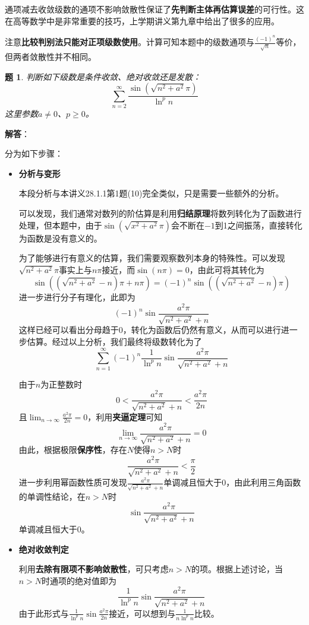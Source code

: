 \documentclass[a4paper,UTF8,fontset=windows,AutoFakeBold]{ctexart}
\newcommand*{\suminf}[1][n=1]{\sum_{#1}^\infty}
\newcommand*{\note}{\noindent *}
\theoremstyle{ex}
\newtheorem{exercise}{题}
\newcommand{\sol}[1]{{\vspace{5pt}\kaishu\noindent\textbf{解答}：\vspace{-3pt}
\begin{compactitem}
    \item[] #1
\end{compactitem}
}}
\begin{document}
\note 通项减去收敛级数的通项不影响敛散性保证了\textbf{先判断主体再估算误差}的可行性。这在高等数学中是非常重要的技巧，上学期讲义第九章中给出了很多的应用。

\note 注意\textbf{比较判别法只能对正项级数使用}。计算可知本题中的级数通项与$\frac{(-1)^n}{\sqrt{n}}$等价，但两者敛散性并不相同。

\begin{framed}
\begin{exercise}
    判断如下级数是条件收敛、绝对收敛还是发散：
    $$\suminf[n=2]\frac{\sin(\sqrt{n^2+a^2}\pi)}{\ln^pn}$$
    这里参数$a\ne0$、$p\ge0$。
\end{exercise}
\sol{
    分为如下步骤：
    \begin{itemize}
        \item \textbf{分析与变形}
        
        \note 本段分析与本讲义28.1.1第1题(10)完全类似，只是需要一些额外的分析。
                
        可以发现，我们通常对数列的阶估算是利用\textbf{归结原理}将数列转化为了函数进行处理，但本题中，由于$\sin(\sqrt{x^2+a^2}\pi)$会不断在$-1$到1之间振荡，直接转化为函数是没有意义的。

        为了能够进行有意义的估算，我们需要观察数列本身的特殊性。可以发现$\sqrt{n^2+a^2}\pi$事实上与$n\pi$接近，而$\sin(n\pi)=0$，由此可将其转化为
        $$\sin((\sqrt{n^2+a^2}-n)\pi+n\pi)=(-1)^n\sin((\sqrt{n^2+a^2}-n)\pi)$$
        进一步进行分子有理化，此即为
        $$(-1)^n\sin\frac{a^2\pi}{\sqrt{n^2+a^2}+n}$$
        这样已经可以看出分母趋于0，转化为函数后仍然有意义，从而可以进行进一步估算。经过以上分析，我们最终将级数转化为了
        $$\suminf(-1)^n\frac{1}{\ln^pn}\sin\frac{a^2\pi}{\sqrt{n^2+a^2}+n}$$
        
        由于$n$为正整数时
        $$0<\frac{a^2\pi}{\sqrt{n^2+a^2}+n}<\frac{a^2\pi}{2n}$$
        且$\lim_{n\to\infty}\frac{a^2\pi}{2n}=0$，利用\textbf{夹逼定理}可知
        $$\lim_{n\to\infty}\frac{a^2\pi}{\sqrt{n^2+a^2}+n}=0$$
        由此，根据极限\textbf{保序性}，存在$N$使得$n>N$时
        $$\frac{a^2\pi}{\sqrt{n^2+a^2}+n}<\frac{\pi}{2}$$
        进一步利用幂函数性质可发现$\frac{a^2\pi}{\sqrt{n^2+a^2}+n}$单调减且恒大于0，由此利用三角函数的单调性结论，在$n>N$时
        $$\sin\frac{a^2\pi}{\sqrt{n^2+a^2}+n}$$
        单调减且恒大于0。

        \item \textbf{绝对收敛判定}
        
        利用\textbf{去除有限项不影响敛散性}，可只考虑$n>N$的项。根据上述讨论，当$n>N$时通项的绝对值即为
        $$\frac{1}{\ln^pn}\sin\frac{a^2\pi}{\sqrt{n^2+a^2}+n}$$
        由于此形式与$\frac{1}{\ln^pn}\sin\frac{a^2\pi}{2n}$接近，可以想到与$\frac{1}{n\ln^pn}$比较。
        

\end{itemize}}
\end{framed}
\end{document}
